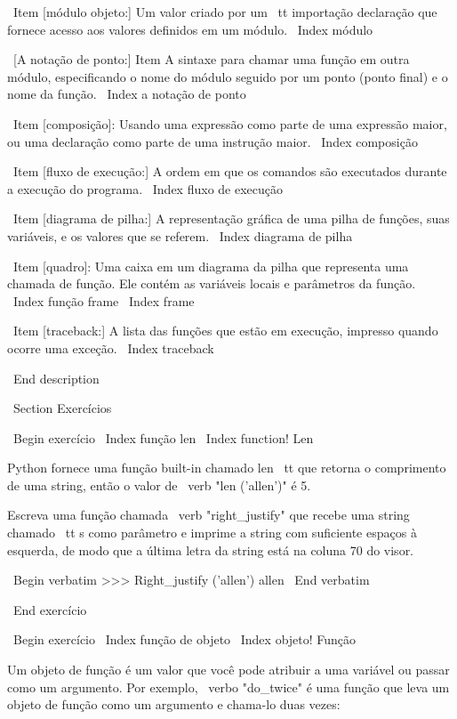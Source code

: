 \documentclass[10pt]{book}
\begin{document}
{\ Item [módulo objeto:] Um valor criado por um {\ tt importação} declaração
que fornece acesso aos valores definidos em um módulo.
\ Index {módulo}

\ [A notação de ponto:] Item A sintaxe para chamar uma função em outra
módulo, especificando o nome do módulo seguido por um ponto (ponto final) e
o nome da função.
\ Index {} a notação de ponto

\ Item [composição]: Usando uma expressão como parte de uma expressão maior,
ou uma declaração como parte de uma instrução maior.
\ Index {composição}

\ Item [fluxo de execução:] A ordem em que os comandos são executados durante
a execução do programa.
\ Index {fluxo de execução}

\ Item [diagrama de pilha:] A representação gráfica de uma pilha de funções,
suas variáveis, e os valores que se referem.
\ Index {diagrama de pilha}

\ Item [quadro]: Uma caixa em um diagrama da pilha que representa uma chamada de função.
Ele contém as variáveis ​​locais e parâmetros da função.
\ Index {função frame}
\ Index {frame}

\ Item [traceback:] A lista das funções que estão em execução,
impresso quando ocorre uma exceção.
\ Index {} traceback


\ End {description}


\ Section {Exercícios}

\ Begin {} exercício
\ Index {função len}
\ Index {function! Len}

Python fornece uma função built-in chamado {len \ tt} que
retorna o comprimento de uma string, então o valor de \ verb "len ('allen')" é 5.

Escreva uma função chamada \ verb "right_justify" que recebe uma string
chamado {\ tt s} como parâmetro e imprime a string com suficiente
espaços à esquerda, de modo que a última letra da string está na coluna 70
do visor.

\ Begin {verbatim}
>>> Right_justify ('allen')
                                                                 allen
\ End {verbatim}

\ End {} exercício


\ Begin {} exercício
\ Index {função de objeto}
\ Index {objeto! Função}

Um objeto de função é um valor que você pode atribuir a uma variável
ou passar como um argumento. Por exemplo, \ verbo "do_twice" é uma função
que leva um objeto de função como um argumento e chama-lo duas vezes:

}
\end{document}
